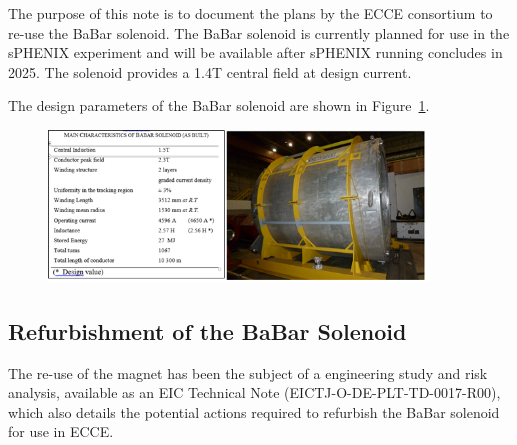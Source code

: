 The purpose of this note is to document the plans by the ECCE consortium to re-use the BaBar solenoid.  The BaBar solenoid is currently planned for use in the sPHENIX experiment and will be available after sPHENIX running concludes in 2025. The solenoid provides a 1.4T central field at design current. 

The design parameters of the BaBar solenoid are shown in Figure~\ref{fig:BaBarStats}. 

\begin{figure}[h!tbp]
    \centering
    \includegraphics[width=0.9\textwidth]{figs/BaBar_Stats.png}
    \caption{}
    \label{fig:BaBarStats}
\end{figure}

\subsection{Refurbishment of the BaBar Solenoid}

The re-use of the magnet has been the subject of a engineering study and risk analysis, available as an EIC Technical Note (EICTJ-O-DE-PLT-TD-0017-R00), which also details the potential actions required to refurbish the BaBar solenoid for use in ECCE. 
